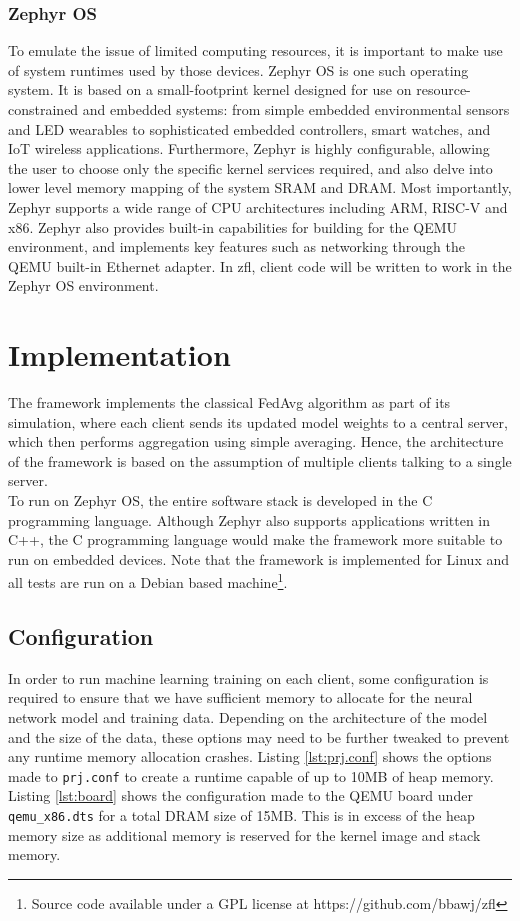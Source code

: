 \documentclass[12pt]{article}
\begin{document}
\subsubsection{Zephyr OS}
To emulate the issue of limited computing resources, it is important to make use of system runtimes
used by those devices. Zephyr OS\cite{zephyr} is one such operating system. It is based on a small-footprint kernel designed for use on resource-constrained
and embedded systems: from simple embedded environmental sensors and LED wearables to sophisticated embedded controllers, smart watches, and IoT wireless applications.
Furthermore, Zephyr is highly configurable, allowing the user to choose only the specific kernel
services required, and also delve into lower level memory mapping of the system SRAM and DRAM. Most
importantly, Zephyr supports a wide range of CPU architectures including ARM, RISC-V and x86.
Zephyr also provides built-in capabilities for building for the QEMU environment, and implements key
features such as networking through the QEMU built-in Ethernet adapter. In zfl,
client code will be written to work in the Zephyr OS environment.

\pagebreak
\section{Implementation}\label{implementation}
The framework implements the classical FedAvg algorithm\cite{brendan_2016_communicationefficient} as part of
its simulation, where each client sends its updated model weights to a central server, which then performs aggregation
using simple averaging. Hence, the architecture of the framework is based on the assumption of
multiple clients talking to a single server.\\

To run on Zephyr OS, the entire software stack is developed in the C programming language. Although
Zephyr also supports applications written in C++, the C programming language would make the framework
more suitable to run on embedded devices. Note that the framework is implemented for Linux and all tests are run
on a Debian based machine\footnote{Source code available under a
GPL license at https://github.com/bbawj/zfl}.

\subsection{Configuration}
In order to run machine learning training on each client, some configuration is required to ensure
that we have sufficient memory to allocate for the neural network model and training data. Depending
on the architecture of the model and the size of the data, these options may need to be further tweaked to
prevent any runtime memory allocation crashes. Listing \ref{lst:prj.conf} shows the options made to
\verb|prj.conf| to create a runtime capable of up to 10MB of heap memory. Listing
\ref{lst:board} shows
the configuration made to the QEMU board under \verb|qemu_x86.dts| for a total DRAM size of 15MB.
This is in excess of the heap memory size as additional memory is reserved for the kernel image and
stack memory.\\
\end{document}
